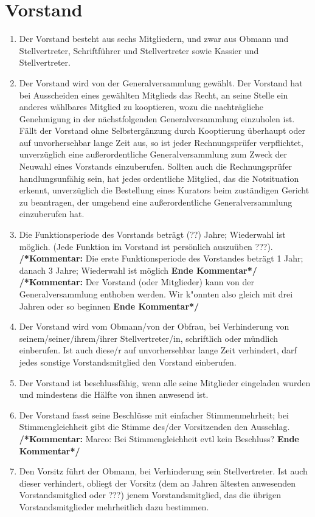 \documentclass[a4paper,12pt]{article}
\newcommand{\comment}[1]{{\bf /*Kommentar:} #1 {\bf Ende Kommentar*/}}
\begin{document}
\section{Vorstand} %
\begin{enumerate}
\item Der Vorstand besteht aus sechs Mitgliedern, und zwar aus Obmann und Stellvertreter, Schriftführer und Stellvertreter sowie Kassier und Stellvertreter.
\item Der Vorstand wird von der Generalversammlung gewählt. Der Vorstand hat bei Ausscheiden eines gewählten Mitglieds das Recht, an seine Stelle ein anderes wählbares Mitglied zu kooptieren, wozu die nachträgliche Genehmigung in der nächstfolgenden Generalversammlung einzuholen ist. Fällt der Vorstand ohne Selbstergänzung durch Kooptierung überhaupt oder auf unvorhersehbar lange Zeit aus, so ist jeder Rechnungsprüfer verpflichtet, unverzüglich eine außerordentliche Generalversammlung zum Zweck der Neuwahl eines Vorstands einzuberufen. Sollten auch die Rechnungsprüfer handlungsunfähig sein, hat jedes ordentliche Mitglied, das die Notsituation erkennt, unverzüglich die Bestellung eines Kurators beim zuständigen Gericht zu beantragen, der umgehend eine außerordentliche Generalversammlung einzuberufen hat.
\item Die Funktionsperiode des Vorstands beträgt (??) Jahre; Wiederwahl ist möglich. (Jede Funktion im Vorstand ist persönlich auszuüben ???).
\comment{Die erste Funktionsperiode des Vorstandes betr\"agt 1 Jahr; danach 3 Jahre; Wiederwahl ist m\"oglich}
\comment{Der Vorstand (oder Mitglieder) kann von der Generalversammlung enthoben werden. Wir k"onnten also gleich mit drei Jahren oder so beginnen}
\item Der Vorstand wird vom Obmann/von der Obfrau, bei Verhinderung von seinem/seiner/ihrem/ihrer Stellvertreter/in, schriftlich oder mündlich einberufen. Ist auch diese/r auf unvorhersehbar lange Zeit verhindert, darf jedes sonstige Vorstandsmitglied den Vorstand einberufen.
\item Der Vorstand ist beschlussfähig, wenn alle seine Mitglieder eingeladen wurden und mindestens die Hälfte von ihnen anwesend ist.
\item Der Vorstand fasst seine Beschlüsse mit einfacher Stimmenmehrheit; bei Stimmengleichheit gibt die Stimme des/der Vorsitzenden den Ausschlag.
\comment{Marco: Bei Stimmengleichheit evtl kein Beschluss?}
\item Den Vorsitz führt der Obmann, bei Verhinderung sein Stellvertreter. Ist auch dieser verhindert, obliegt der Vorsitz (dem an Jahren ältesten anwesenden Vorstandsmitglied oder ???) jenem Vorstandsmitglied, das die übrigen Vorstandsmitglieder mehrheitlich dazu bestimmen.

\end{enumerate}
\end{document}
